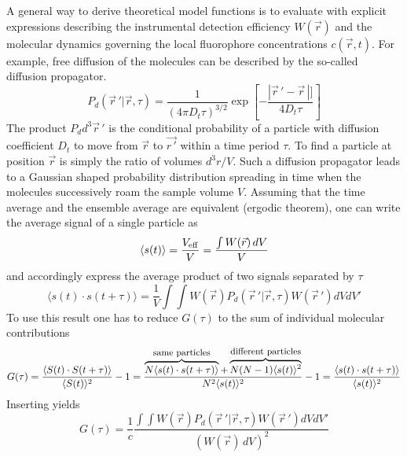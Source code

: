 A general way to derive theoretical model functions is to evaluate  with explicit expressions describing the instrumental detection efficiency $W(\vec{r})$ and the molecular dynamics governing the local fluorophore concentrations $c(\vec{r},t)$. For example, free diffusion of the molecules can be described by the so-called diffusion propagator.
	\begin{equation}
	\label{eq4}
	P_d \left( \vec{r} \,' | \vec{r},\tau \right) = \frac{1}{\left( 4 \pi D_t \tau \right) ^{3/2}} \exp \left[ - \frac{\left| \vec{r} \,' -\vec{r} \, \right|]} {4D_t \tau} \right]
	\end{equation}
The product $P_d d^3 \vec{r} \,'$ is the conditional probability of a particle with diffusion coefficient $D_t$ to move from $\vec{r}$ to $\vec{r \,'}$ within a time period $\tau$. To find a particle at position $\vec{r}$ is simply the ratio of  volumes $d^3r/V$. Such a diffusion propagator leads to a Gaussian shaped probability distribution spreading in time when the molecules successively roam the sample volume $V$.
Assuming that the time average and the ensemble average are equivalent (ergodic theorem), one can write the average signal of a single particle as
	\begin{equation}
	\label{eq5}
	\langle s(t) \rangle = \frac{V_{\rm eff}}{V} = \frac{\int W(\vec{r}) \,dV}{V}
	\end{equation}
and accordingly express the average product of two signals separated by $\tau$
	\begin{equation}
	\label{eq6}
	\langle s(t) \cdot s(t + \tau) \rangle = \frac{1}{V} \int \int W(\vec{r}) P_d \left( \vec{r} \,' | \vec{r},\tau \right) W(\vec{r} \,') dVdV'
	\end{equation}
To use this result one has to reduce $G(\tau)$ to the sum of individual molecular contributions
	\begin{equation}
	\label{eq7}
	G(\tau) = \frac{\langle S(t) \cdot S(t+\tau)\rangle}{\langle S(t) \rangle^2}-1 = \frac{\overbrace{N \langle s(t) \cdot s(t+\tau)\rangle}^{\mbox{\small same particles}} +\overbrace{N(N-1) \langle s(t) \rangle^2}^{\mbox{\small different particles}}}{N^2 \langle s(t) \rangle^2}-1 = \frac{\langle s(t) \cdot s(t+\tau)\rangle}{\langle s(t) \rangle^2}
	\end{equation}
Inserting  yields
	\begin{equation}
	\label{eq8}
	G(\tau) = \frac{1}{c} \frac{\int \int W(\vec{r}) P_d \left( \vec{r} \,' | \vec{r},\tau \right) W(\vec{r} \,') dVdV'}{\left( W(\vec{r}) \,dV \right)^2}
	\end{equation}
